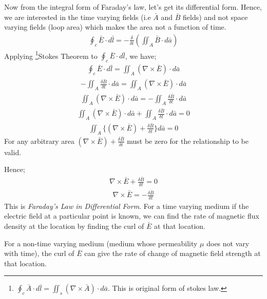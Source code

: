 Now from the integral form of Faraday's law, let's get its differential form. Hence, we are interested in the time varying fields (i.e $\bar{A}$ and $\bar{B}$ fields) and not space varying fields (loop area) which makes the area not a function of time.
\begin{align*}
{\oint_c\bar{E}\cdot d\bar{l} = -\frac{\delta}{\delta t}(\iint_A\bar{B}\cdot d\bar{a})}
\end{align*}	
Applying \footnote[9]{$\oint_c\bar{A}\cdot d\bar{l} = \iint_s(\nabla \times \bar{A})\cdot d\bar{a}$. This is original form of stokes law.}Stokes Theorem to $\oint_c\bar{E}\cdot d\bar{l}$, we have;
\begin{align*}
\oint_c\bar{E}\cdot d\bar{l} = \iint_A(\nabla\times\bar{E})\cdot d\bar{a}
\end{align*}
\begin{align*}
-\iint_A\frac{\delta \bar{B}}{\delta t}\cdot d\bar{a} = \iint_A(\nabla\times\bar{E})\cdot d\bar{a}
\end{align*}
\begin{align*}
\iint_A(\nabla\times\bar{E})\cdot d\bar{a} = -\iint_A\frac{\delta \bar{B}}{\delta t}\cdot d\bar{a}
\end{align*}
\begin{align*}
\iint_A(\nabla\times\bar{E})\cdot d\bar{a} + \iint_A\frac{\delta \bar{B}}{\delta t}\cdot d\bar{a} = 0
\end{align*}
\begin{align*}
\iint_A\{(\nabla \times \bar{E})+ \frac{\delta \bar{B}}{\delta t}\} d\bar{a} = 0
\end{align*} 
For any arbitrary area $(\nabla \times \bar{E})+ \frac{\delta \bar{B}}{\delta t}$ must be zero for the relationship to be valid.

Hence;
\begin{align*}
\nabla \times \bar{E}+ \frac{\delta \bar{B}}{\delta t} = 0
\end{align*}
\begin{align}
\nabla \times \bar{E} = -\frac{\delta \bar{B}}{\delta t}
\end{align}
This is \emph{Faraday's Law in Differential Form}. For a time varying medium if the electric field at a particular point is known, we can find the rate of magnetic flux density at the location by finding the curl of $\bar{E}$ at that location.

For a non-time varying medium (medium whose permeability $\mu$ does not vary with time), the curl of $\bar{E}$ can give the rate of change of magnetic field strength at that location.

